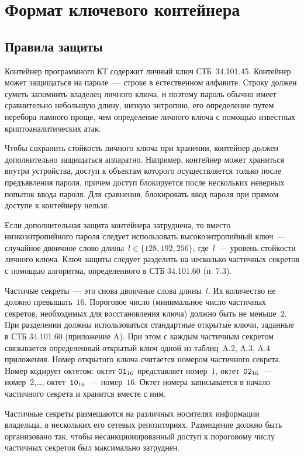 \chapter{Формат ключевого контейнера}\label{CONT}

\section{Правила защиты}\label{CONT.Rules}

Контейнер программного КТ содержит личный ключ СТБ~34.101.45.
Контейнер может защищаться на пароле~--- строке в естественном алфавите. 
Строку должен суметь запомнить владелец личного ключа, и поэтому пароль 
обычно имеет сравнительно небольшую длину, низкую энтропию, его 
определение путем перебора намного проще, чем определение личного ключа с 
помощью известных криптоаналитических атак. 

Чтобы сохранить стойкость личного ключа при хранении, контейнер должен
дополнительно защищаться аппаратно. Например, контейнер может храниться
внутри устройства, доступ к объектам которого осуществляется только после 
предъявления пароля, причем доступ блокируется после нескольких неверных 
попыток ввода пароля. Для сравнения, блокировать ввод пароля при прямом 
доступе к контейнеру нельзя.  

Если дополнительная защита контейнера затруднена, то вместо 
низкоэнтропийного пароля следует использовать высокоэнтропийный ключ~--- 
случайное двоичное слово длины~$l\in\{128,192,256\}$, где~$l$~--- уровень 
стойкости личного ключа.  
%
Ключ защиты следует разделить на несколько частичных секретов с помощью 
алгоритма, определенного в СТБ 34.101.60 (п. 7.3). 

Частичые секреты~--- это снова двоичные слова длины~$l$. Их количество не 
должно превышать~$16$. Пороговое число (минимальное число частичных секретов,
необходимых для восстановления ключа) должно быть не меньше~$2$.
%
При разделении должны использоваться стандартные открытые 
ключи, заданные в СТБ 34.101.60 (приложение A). При этом с каждым частичным секретом 
связывается определенный открытый ключ одной из таблиц~A.2, A.3, 
A.4 приложения. 
%
Номер открытого ключа считается номером частичного секрета.
Номер кодирует октетом: октет $\texttt{01}_{16}$ представляет номер~$1$, 
октет~$\texttt{02}_{16}$~--- номер~$2$,\ldots, октет~$\texttt{10}_{16}$~--- номер~$16$.
Октет номера записывается в начало частичного секрета и хранится вместе с 
ним.

Частичные секреты размещаются на различных носителях информации 
владельца, в нескольких его сетевых репозиториях. 
%
Размещение должно быть организовано так, чтобы несанкционированный 
доступ к пороговому числу частичных секретов был максимально затруднен.

